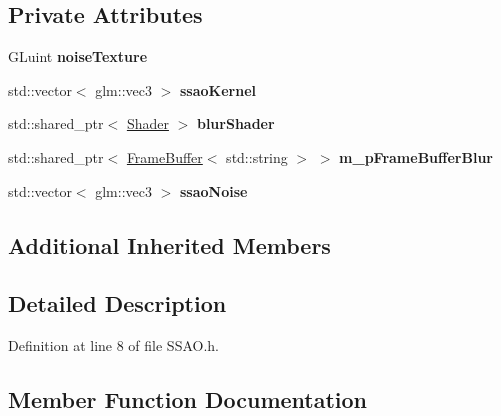 \subsection*{Private Attributes}
\begin{DoxyCompactItemize}
\item 
G\+Luint {\bfseries noise\+Texture}\hypertarget{class_post_process_1_1_s_s_a_o_a5ef10a9e3cb9bc5759f01569f2c1f0e1}{}\label{class_post_process_1_1_s_s_a_o_a5ef10a9e3cb9bc5759f01569f2c1f0e1}

\item 
std\+::vector$<$ glm\+::vec3 $>$ {\bfseries ssao\+Kernel}\hypertarget{class_post_process_1_1_s_s_a_o_a3a11cb1afa3607756cb000d87e725fee}{}\label{class_post_process_1_1_s_s_a_o_a3a11cb1afa3607756cb000d87e725fee}

\item 
std\+::shared\+\_\+ptr$<$ \hyperlink{class_shader}{Shader} $>$ {\bfseries blur\+Shader}\hypertarget{class_post_process_1_1_s_s_a_o_af9a5785987f63dd32228ad7ff067a985}{}\label{class_post_process_1_1_s_s_a_o_af9a5785987f63dd32228ad7ff067a985}

\item 
std\+::shared\+\_\+ptr$<$ \hyperlink{class_frame_buffer}{Frame\+Buffer}$<$ std\+::string $>$ $>$ {\bfseries m\+\_\+p\+Frame\+Buffer\+Blur}\hypertarget{class_post_process_1_1_s_s_a_o_a7ec33355974ff1a5026e784b5beb5f29}{}\label{class_post_process_1_1_s_s_a_o_a7ec33355974ff1a5026e784b5beb5f29}

\item 
std\+::vector$<$ glm\+::vec3 $>$ {\bfseries ssao\+Noise}\hypertarget{class_post_process_1_1_s_s_a_o_a411b15f1d6a07112accd7f03b618a6fb}{}\label{class_post_process_1_1_s_s_a_o_a411b15f1d6a07112accd7f03b618a6fb}

\end{DoxyCompactItemize}
\subsection*{Additional Inherited Members}


\subsection{Detailed Description}


Definition at line 8 of file S\+S\+A\+O.\+h.



\subsection{Member Function Documentation}
